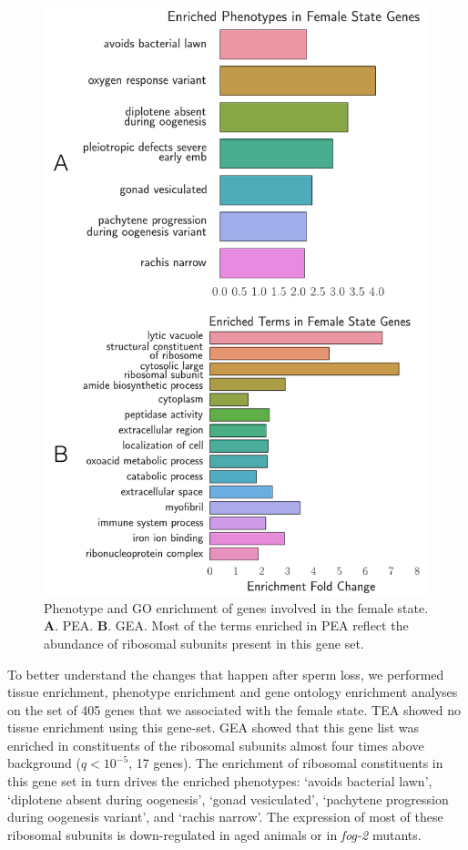\documentclass[10pt,letterpaper,twocolumn]{article}
\newcommand{\fog}{\emph{\mbox{fog-2}}}
\newcommand{\femalen}{405}
\begin{document}
\begin{figure}
  \renewcommand{\familydefault}{\sfdefault}\normalfont{}
  \centering
  \includegraphics[width=0.9\linewidth]{../output/figs/final_figs/female_state_enrichment.pdf}
  \caption{
  Phenotype and GO enrichment of genes involved in the female state.
  \textbf{A}. PEA.
  \textbf{B}. GEA.
  Most of the terms enriched in PEA reflect the abundance of ribosomal subunits
  present in this gene set.
  }
\label{fig:female_state_enrich}
\end{figure}

To better understand the changes that happen after sperm loss, we performed
tissue enrichment, phenotype enrichment and gene ontology enrichment analyses
on the set of \femalen{} genes that we associated with the female state.
TEA showed no tissue enrichment using this gene-set. GEA
showed that this gene list was enriched in constituents of the ribosomal
subunits almost four times above background ($q<10^{-5}$, 17 genes). The
enrichment of ribosomal constituents in this gene set in turn drives the
enriched phenotypes: `avoids bacterial lawn',
`diplotene absent during oogenesis', `gonad vesiculated', `pachytene progression
during oogenesis variant', and `rachis narrow'. The expression of most of these
ribosomal subunits is down-regulated in aged animals or in \fog{} mutants.
\end{document}
